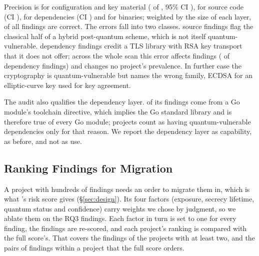 Precision is  for configuration and key material
( of , 95\% CI
),  for source code
(CI ),  for
dependencies (CI ) and
 for binaries; weighted by the size of each layer,
 of all findings are correct. The errors fall into
two classes.  source findings flag the classical
half of a hybrid post-quantum scheme, which is not itself quantum-vulnerable.
 dependency findings credit a TLS library with RSA
key transport that it does not offer; across the whole scan this error affects
 findings ( of
dependency findings) and changes no project's prevalence. In
 further case the cryptography is
quantum-vulnerable but \tool{} names the wrong family, ECDSA for an elliptic-curve
key used for key agreement.

The audit also qualifies the dependency layer.
 of its findings come from a Go module's
toolchain directive, which implies the Go standard library and is therefore
true of every Go module;  projects count as
having quantum-vulnerable dependencies only for that reason. We report the
dependency layer as capability, as before, and not as use.

\subsection{Ranking Findings for Migration}

A project with hundreds of findings needs an order to migrate them in, which
is what \tool{}'s risk score gives (\S\ref{sec:design}). Its four factors
(exposure, secrecy lifetime, quantum status and confidence) carry weights we
chose by judgment, so we ablate them on the RQ3 findings. Each factor in turn
is set to one for every finding, the findings are re-scored, and each
project's ranking is compared with the full score's. That covers the
 findings of the  projects with
at least two, and the  pairs of findings within a
project that the full score orders.

\begin{table}[t]
\centering\footnotesize\setlength{\tabcolsep}{4pt}

\caption{Risk-score ablation over the  RQ3 projects
with at least two findings. Reversed and tied: share of the pairs the full
score orders that the ablated score orders the other way or ties. Top set
changed: projects whose highest-risk findings differ. $\tau_b$: Kendall's
rank correlation with the full score, median over projects.}
\label{tab:risk-ablation}
\end{table}

